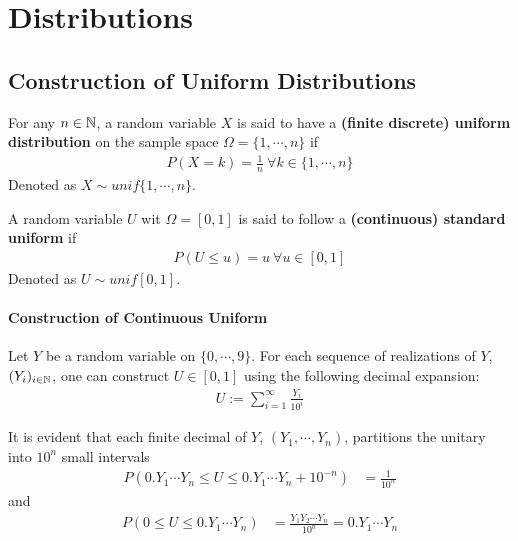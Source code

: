 \documentclass{article}
\begin{document}
   	\section{Distributions}
	
	\subsection{Construction of Uniform Distributions}
   	\begin{definition}
   		For any $n \in \mathbb{N}$, a random variable $X$ is said to have a \textbf{(finite discrete) uniform distribution} on the sample space $\Omega = \{1,\cdots,n\}$ if
   		\begin{align}
   			P(X=k) = \frac{1}{n}\ \forall k \in \{1,\cdots,n\}
   		\end{align}
   		Denoted as $X \sim unif\{1,\cdots,n\}$.
   	\end{definition}

   	\begin{definition}
   		A random variable $U$ wit $\Omega = [0, 1]$ is said to follow a \textbf{(continuous) standard uniform} if 
   		\begin{align}
   			P(U \leq u) = u\ \forall u \in [0, 1]	
   		\end{align}
   		Denoted as $U \sim unif[0, 1]$.
   	\end{definition}
   	
   	\paragraph{Construction of Continuous Uniform} Let $Y$ be a random variable on $\{0, \cdots, 9\}$. For each sequence of realizations of $Y$, $(Y_i)_{i \in \mathbb{N}}$, one can construct $U \in [0, 1]$ using the following decimal expansion:
   	\begin{align}
   		U := \sum_{i=1}^\infty \frac{Y_i}{10^i}
   	\end{align}
   	
   	\begin{proposition}
   		It is evident that each finite decimal  of $Y$, $(Y_1, \cdots, Y_n)$, partitions the unitary into $10^n$ small intervals 
   		\begin{align}
   			P(0.Y_1\cdots Y_n \leq U \leq 0.Y_1\cdots Y_n + 10^{-n}) &= \frac{1}{10^n}
   		\end{align}
   		and 
   		\begin{align}
   			P(0 \leq U \leq 0.Y_1\cdots Y_n) &= \frac{Y_1 Y_2 \cdots Y_n}{10^n} = 0.Y_1\cdots Y_n
   		\end{align}
   	\end{proposition}
   	
\end{document}
